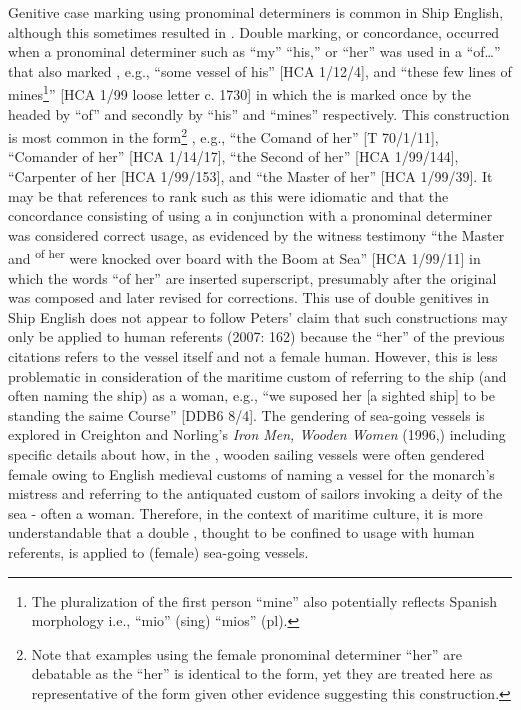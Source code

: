 Genitive case marking using  pronominal determiners is common in Ship English, although this sometimes resulted in . Double  marking, or  concordance, occurred when a pronominal  determiner such as “my” “his,” or “her” was used in a  “of…” that also marked , e.g., “some vessel of his” [HCA 1/12/4], and “these few lines of mines\footnote{The pluralization of the first person   “mine” also potentially reflects Spanish morphology i.e., “mio” (sing) “mios” (pl).}” [HCA 1/99 loose letter c. 1730] in which the  is marked once by the  headed by “of” and secondly by “his” and “mines” respectively. This construction is most common in the  form\footnote{Note that examples using the female   pronominal determiner “her” are debatable as the  “her” is identical to the  form, yet they are treated here as representative of the  form given other evidence suggesting this construction.} , e.g., “the Comand of her” [T 70/1/11], “Comander of her” [HCA 1/14/17], “the Second  of her” [HCA 1/99/144], “Carpenter of her [HCA 1/99/153], and “the Master of her” [HCA 1/99/39]. It may be that references to rank such as this were idiomatic and that the  concordance consisting of using a  in conjunction with a  pronominal determiner was considered correct usage, as evidenced by the witness testimony “the Master and  \textsuperscript{of her} were knocked over board with the Boom at Sea” [HCA 1/99/11] in which the words “of her” are inserted superscript, presumably after the original was composed and later revised for corrections.  This use of double genitives in Ship English does not appear to follow Peters’ claim that such constructions may only be applied to human referents (2007: 162) because the “her” of the previous citations refers to the vessel itself and not a female human. However, this is less problematic in consideration of the maritime custom of referring to the ship (and often naming the ship) as a woman, e.g., “we suposed her [a sighted ship] to be standing the saime Course” [DDB6 8/4]. The gendering of sea-going vessels is explored in Creighton and Norling’s \textit{Iron Men, Wooden Women} (1996,) including specific details about how, in the , wooden sailing vessels were often gendered female owing to English medieval customs of naming a vessel for the monarch’s mistress and referring to the antiquated custom of sailors invoking a deity of the sea - often a woman. Therefore, in the context of maritime culture, it is more understandable that a double , thought to be confined to usage with human referents, is applied to (female) sea-going vessels. 

